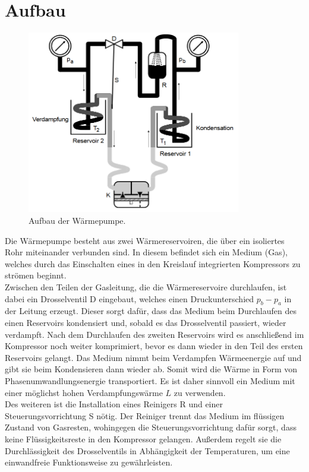 \section{Aufbau}

\begin{figure}[H]
  \centering
  \includegraphics[height=8cm]{Waermepumpe.PNG}
  \caption{Aufbau der Wärmepumpe.\cite{sample}}
  \label{fig:plot}
\end{figure}

Die Wärmepumpe besteht aus zwei Wärmereservoiren, die über ein isoliertes
Rohr miteinander verbunden sind. In diesem befindet sich ein Medium (Gas), welches
durch das Einschalten eines in den Kreislauf integrierten Kompressors zu strömen
beginnt.\\
Zwischen den Teilen der Gasleitung, die die Wärmereservoire durchlaufen,
ist dabei ein Drosselventil D eingebaut, welches einen Druckunterschied $p_b-p_a$
in der Leitung erzeugt. Dieser sorgt dafür, dass das Medium beim Durchlaufen
des einen Reservoirs kondensiert und, sobald es das Drosselventil passiert,
wieder verdampft. Nach dem Durchlaufen des zweiten Reservoirs wird es anschließend im Kompressor noch
weiter komprimiert, bevor es dann wieder in den Teil des ersten Reservoirs gelangt.
Das Medium nimmt beim Verdampfen Wärmeenergie auf und gibt sie beim Kondensieren
dann wieder ab. Somit wird die Wärme in Form von Phasenumwandlungsenergie transportiert.
Es ist daher sinnvoll ein Medium mit einer möglichst hohen Verdampfungswärme $L$
zu verwenden.\\
Des weiteren ist die Installation eines Reinigers R und einer Steuerungsvorrichtung
S nötig. Der Reiniger trennt das Medium im flüssigen Zustand von Gasresten, wohingegen
die Steuerungsvorrichtung dafür sorgt, dass keine Flüssigkeitsreste in den Kompressor
gelangen. Außerdem regelt sie die Durchlässigkeit des Drosselventils in Abhängigkeit
der Temperaturen, um eine einwandfreie Funktionsweise zu gewährleisten.

\label{sec:Aufbau}
